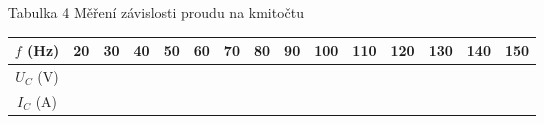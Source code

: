 \documentclass[a4paper,12pt]{report}
\begin{document}
\begin{itemize}
\begin{center}
	\end{center}
 \item[Tabulka 4]{Měření závislosti proudu na kmitočtu}
	\begin{center}
		\begin{tabular}{|c|c|c|c|c|c|c|c|c|c|c|c|c|c|c|}
\hline
$f$ (Hz)  & 20 & 30 & 40 & 50 & 60 & 70 & 80 & 90 & 100 & 110 & 120 & 130 & 140 & 150 \\\hline
$U_C$ (V) &    &    &    &    &    &    &    &    &     &     &     &     &     &     \\\hline
$I_C$ (A) &    &    &    &    &    &    &    &    &     &     &     &     &     &     \\\hline
		\end{tabular}
	\end{center}
\end{itemize}
\end{document}
